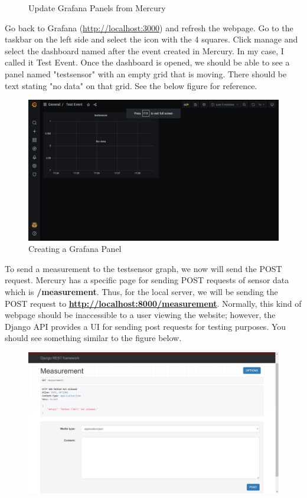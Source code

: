 \documentclass[12pt, letterpaper]{article}
\begin{document}
{{{{{{{{{{{{\begin{figure}[h!]
	\caption{Update Grafana Panels from Mercury}
	\end{figure}	
\par Go back to Grafana (\url{http://localhost:3000}) and refresh the webpage. Go to the taskbar on the left side and select the icon with the 4 squares. Click manage and select the dashboard named after the event created in Mercury. In my case, I called it Test Event. Once the dashboard is opened, we should be able to see a panel named "testsensor" with an empty grid that is moving. There should be text stating "no data" on that grid. See the below figure for reference. 
\begin{figure}[h!]
	\centering
	\includegraphics[width=1\columnwidth]{assets/grafana_panel.png}
	\caption{Creating a Grafana Panel}
	\end{figure}	
\par 
	To send a measurement to the testsensor graph, we now will send the POST request. Mercury has a specific page for sending POST requests of sensor data which is \textbf{/measurement}. Thus, for the local server, we will be sending the POST request to \textbf{\url{http://localhost:8000/measurement}}. Normally, this kind of webpage should be inaccessible to a user viewing the website; however, the Django API provides a UI for sending post requests for testing purposes. You should see something similar to the figure below. 
\begin{figure}[h!]
	\centering
	\includegraphics[width=1\columnwidth]{assets/measurement_post.png}

\end{figure}}}}}}}}}}}}}
\end{document}
